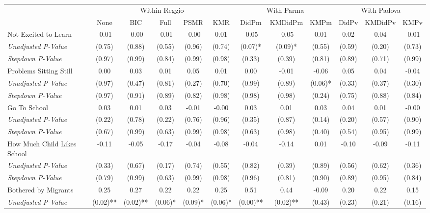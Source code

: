 \begin{tabular}{l c c c c c c c c c c c}
\toprule
& \multicolumn{5}{c}{Within Reggio} & \multicolumn{3}{c}{With Parma} & \multicolumn{3}{c}{With Padova} \\\cmidrule(lr){2-6} \cmidrule(lr){7-9} \cmidrule(lr){10-12}
 & None & BIC & Full & PSMR & KMR & DidPm & KMDidPm & KMPm & DidPv & KMDidPv & KMPv \\
\midrule
Not Excited to Learn & -0.01 & -0.00 & -0.01 & -0.00 & 0.01 & -0.05 & -0.05 & 0.01 & 0.02 & 0.04 & -0.01 \\
\quad \textit{Unadjusted P-Value} & (0.75) & (0.88) & (0.55) & (0.96) & (0.74) & (0.07)* & (0.09)* & (0.55) & (0.59) & (0.20) & (0.73) \\
\quad \textit{Stepdown P-Value} & (0.97) & (0.99) & (0.84) & (0.99) & (0.98) & (0.33) & (0.39) & (0.81) & (0.89) & (0.71) & (0.99) \\
Problems Sitting Still & 0.00 & 0.03 & 0.01 & 0.05 & 0.01 & 0.00 & -0.01 & -0.06 & 0.05 & 0.04 & -0.04 \\
\quad \textit{Unadjusted P-Value} & (0.97) & (0.47) & (0.81) & (0.27) & (0.70) & (0.99) & (0.89) & (0.06)* & (0.33) & (0.37) & (0.30) \\
\quad \textit{Stepdown P-Value} & (0.97) & (0.91) & (0.89) & (0.82) & (0.98) & (0.98) & (0.98) & (0.24) & (0.75) & (0.88) & (0.84) \\
Go To School & 0.03 & 0.01 & 0.03 & -0.01 & -0.00 & 0.03 & 0.01 & 0.03 & 0.04 & 0.01 & -0.00 \\
\quad \textit{Unadjusted P-Value} & (0.22) & (0.78) & (0.22) & (0.76) & (0.96) & (0.35) & (0.87) & (0.14) & (0.20) & (0.57) & (0.90) \\
\quad \textit{Stepdown P-Value} & (0.67) & (0.99) & (0.63) & (0.99) & (0.98) & (0.63) & (0.98) & (0.40) & (0.54) & (0.95) & (0.99) \\
How Much Child Likes School & -0.11 & -0.05 & -0.17 & -0.04 & -0.08 & -0.04 & -0.14 & 0.01 & -0.10 & -0.09 & -0.11 \\
\quad \textit{Unadjusted P-Value} & (0.33) & (0.67) & (0.17) & (0.74) & (0.55) & (0.82) & (0.39) & (0.89) & (0.56) & (0.62) & (0.36) \\
\quad \textit{Stepdown P-Value} & (0.79) & (0.99) & (0.63) & (0.99) & (0.98) & (0.96) & (0.81) & (0.90) & (0.89) & (0.95) & (0.84) \\
Bothered by Migrants & 0.25 & 0.27 & 0.22 & 0.22 & 0.25 & 0.51 & 0.44 & -0.09 & 0.20 & 0.22 & 0.15 \\
\quad \textit{Unadjusted P-Value} & (0.02)** & (0.02)** & (0.06)* & (0.09)* & (0.06)* & (0.00)** & (0.02)** & (0.43) & (0.23) & (0.21) & (0.16) \\

\end{tabular}
